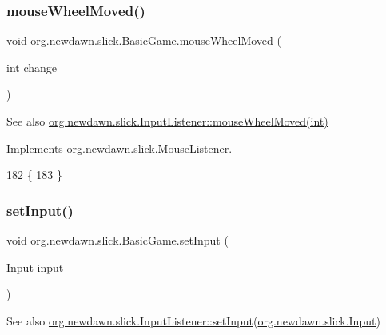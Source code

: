 \subsubsection{\texorpdfstring{mouse\+Wheel\+Moved()}{mouseWheelMoved()}}
{\footnotesize\ttfamily void org.\+newdawn.\+slick.\+Basic\+Game.\+mouse\+Wheel\+Moved (\begin{DoxyParamCaption}\item[{int}]{change }\end{DoxyParamCaption})\hspace{0.3cm}{\ttfamily [inline]}}

\begin{DoxySeeAlso}{See also}
\mbox{\hyperlink{interfaceorg_1_1newdawn_1_1slick_1_1_mouse_listener_ad7e49c969e1f0315ecdf238f715953d1}{org.\+newdawn.\+slick.\+Input\+Listener\+::mouse\+Wheel\+Moved(int)}} 
\end{DoxySeeAlso}


Implements \mbox{\hyperlink{interfaceorg_1_1newdawn_1_1slick_1_1_mouse_listener_ad7e49c969e1f0315ecdf238f715953d1}{org.\+newdawn.\+slick.\+Mouse\+Listener}}.


\begin{DoxyCode}
182                                             \{
183     \}
\end{DoxyCode}
\mbox{\label{classorg_1_1newdawn_1_1slick_1_1_basic_game_ac9847e7f185de833f745fd75b8b5730b}} 
\subsubsection{\texorpdfstring{set\+Input()}{setInput()}}
{\footnotesize\ttfamily void org.\+newdawn.\+slick.\+Basic\+Game.\+set\+Input (\begin{DoxyParamCaption}\item[{\mbox{\hyperlink{classorg_1_1newdawn_1_1slick_1_1_input}{Input}}}]{input }\end{DoxyParamCaption})\hspace{0.3cm}{\ttfamily [inline]}}

\begin{DoxySeeAlso}{See also}
\mbox{\hyperlink{interfaceorg_1_1newdawn_1_1slick_1_1_controlled_input_reciever_ab838ca221a429b05c0b53aea9b4fe72f}{org.\+newdawn.\+slick.\+Input\+Listener\+::set\+Input}}(\mbox{\hyperlink{classorg_1_1newdawn_1_1slick_1_1_input}{org.\+newdawn.\+slick.\+Input}}) 
\end{DoxySeeAlso}


